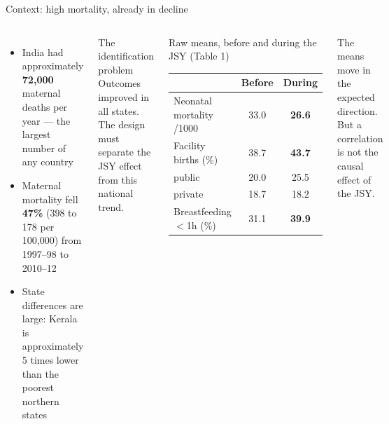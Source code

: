 \documentclass[aspectratio=169,11pt]{beamer}
\newcommand{\kn}[1]{{\color{jsyred}\bfseries #1}}
\begin{document}
\begin{frame}{Context: high mortality, already in decline}
  \begin{columns}[T]
    \begin{itemize}
      \item India had approximately \kn{72{,}000} maternal deaths per year --- the largest number of any country
      \item Maternal mortality fell \kn{47\%} (398 to 178 per 100{,}000) from 1997--98 to 2010--12
      \item State differences are large: Kerala is approximately 5 times lower than the poorest northern states
    \end{itemize}
    \vspace{0.3em}
    \begin{alertblock}{The identification problem}
      Outcomes improved in all states. The design must separate the JSY effect from this national trend.
    \end{alertblock}
    \begin{block}{Raw means, before and during the JSY (Table 1)}
      \centering\footnotesize
      \begin{tabular}{lcc}
        \toprule & Before & During \\ \midrule
        Neonatal mortality /1000 & 33.0 & \kn{26.6} \\
        Facility births (\%) & 38.7 & \kn{43.7} \\
        \quad public & 20.0 & 25.5 \\
        \quad private & 18.7 & 18.2 \\
        Breastfeeding $<$1h (\%) & 31.1 & \kn{39.9} \\
        \bottomrule
      \end{tabular}
    \end{block}
    \footnotesize The means move in the expected direction. But a correlation is not the causal effect of the JSY.
  \end{columns}
\end{frame}

\end{document}
